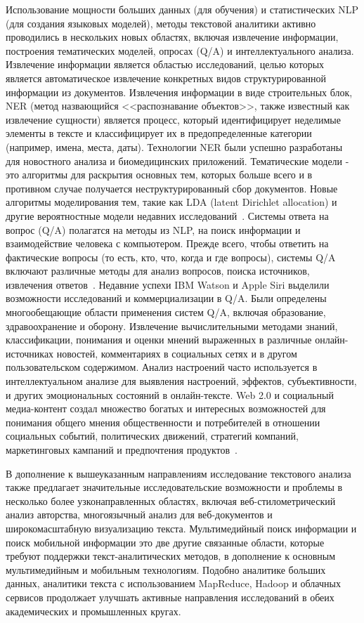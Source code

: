 Использование мощности больших данных (для обучения) и статистических
NLP (для создания языковых моделей), методы текстовой аналитики
активно проводились в нескольких новых областях,
включая извлечение информации, построения тематических моделей, опросах
(Q/A) и интеллектуального анализа. Извлечение информации
является областью исследований, целью которых является автоматическое извлечение
конкретных видов структурированной информации из документов. Извлечения информации в виде
строительных блок, NER (метод назвающийся
<<распознавание объектов>>, также известный как извлечение сущности) является
процесс, который идентифицирует неделимые элементы в тексте и классифицирует
их в предопределенные категории (например, имена, места, даты).
Технологии NER были успешно разработаны для новостного
анализа и биомедицинских приложений. Тематические модели - это алгоритмы
для раскрытия основных тем, которых больше всего
и в противном случае получается неструктурированный сбор документов. Новые
алгоритмы моделирования тем, такие как LDA (latent Dirichlet
allocation) и другие вероятностные модели
недавних исследований~\cite{Blei:2012}. Системы ответа на вопрос (Q/A)
полагатся на методы из NLP, на поиск информации и
взаимодействие человека с компьютером. Прежде всего, чтобы ответить на
фактические вопросы (то есть, кто, что, когда и где
вопросы), системы Q/A включают различные методы для
анализ вопросов, поиска источников, извлечения ответов~\cite{Maybury:2004}. Недавние успехи
IBM Watson и Apple Siri выделили
возможности исследований и коммерциализации в Q/A. Были определены многообещающие области применения систем Q/A,
включая образование, здравоохранение и оборону. Извлечение вычислительными методами знаний, классификации,
понимания и оценки мнений выраженных в
различные онлайн-источниках новостей, комментариях в социальных сетях и в
другом пользовательском содержимом. Анализ настроений часто
используется в интеллектуальном анализе для выявления настроений, эффектов, субъективности,
и других эмоциональных состояний в онлайн-тексте. Web 2.0 и
социальный медиа-контент создал множество богатых и интересных
возможностей для понимания общего мнения
общественности и потребителей в отношении социальных событий, политических движений,
стратегий компаний, маркетинговых кампаний и предпочтения продуктов~\cite{Pang:2008}.

В дополнение к вышеуказанным направлениям исследование текстового анализа также
предлагает значительные исследовательские возможности и проблемы в
несколько более узконаправленных областях, включая веб-стилометрический
анализ авторства, многоязычный анализ для
веб-документов и широкомасштабную визуализацию текста. Мультимедийный
поиск информации и поиск мобильной информации
это две другие связанные области, которые требуют поддержки текст-аналитических методов, в дополнение к основным мультимедийным и
мобильным технологиям. Подобно аналитике больших данных,
аналитики текста с использованием MapReduce, Hadoop и облачных сервисов
продолжает улучшать активные направления исследований в обеих академических и промышленных кругах.

